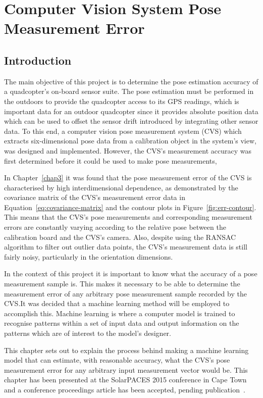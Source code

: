 \chapter[CVS Pose Measurement Error]{Computer Vision System Pose Measurement Error}
\label{chap4}

\section{Introduction}

The main objective of this project is to determine the pose estimation accuracy of a quadcopter's on-board sensor suite. The pose estimation must be performed in the outdoors to provide the quadcopter access to its GPS readings, which is important data for an outdoor quadcopter since it provides absolute position data which can be used to offset the sensor drift introduced by integrating other sensor data. To this end, a computer vision pose measurement system (CVS) which extracts six-dimensional pose data from a calibration object in the system's view, was designed and implemented. However,  the CVS's measurement accuracy was first determined before it could be used to make pose measurements, 

In Chapter~\ref{chap3} it was found that the pose measurement error of the CVS is characterised by high interdimensional dependence, as demonstrated by the covariance matrix of the CVS's measurement error data in Equation~\ref{eq:covariance-matrix} and the contour plots in Figure~\ref{fig:err-contour}. This means that the CVS's pose measurements and corresponding measurement errors are constantly varying according to the relative pose between the calibration board and the CVS's camera. Also, despite using the RANSAC algorithm to filter out outlier data points, the CVS's measurement data is still fairly noisy, particularly in the orientation dimensions.

In the context of this project it is important to know what the accuracy of a pose measurement sample is. This makes it necessary to be able to determine the measurement error of any arbitrary pose measurement sample recorded by the CVS.\@ It was decided that a machine learning method will be employed to accomplish this. Machine learning is where a computer model is trained to recognise patterns within a set of input data and output information on the patterns which are of interest to the model's designer. 

This chapter sets out to explain the process behind making a machine learning model that can estimate, with reasonable accuracy, what the CVS's pose measurement error for any arbitrary input measurement vector would be. This chapter has been presented at the SolarPACES 2015 conference in Cape Town and a conference proceedings article has been accepted, pending publication~\citep{lock2015}. 

